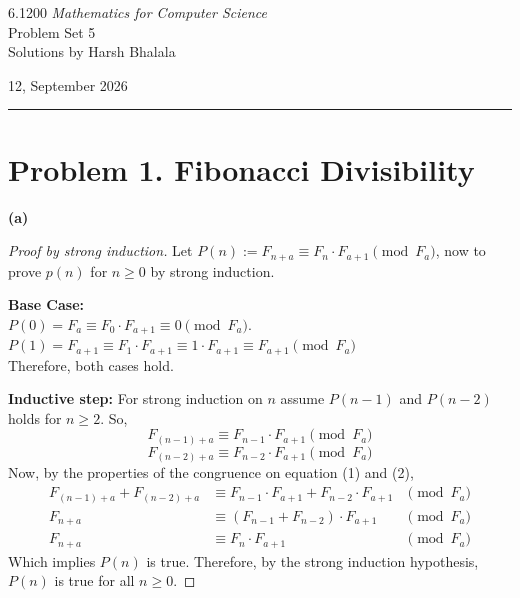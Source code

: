 \documentclass{article}
\begin{document}
\noindent
\begin{minipage}[t]{0.68\textwidth}
{\large 6.1200 \textit{Mathematics for Computer Science}}\\[4pt]
{\large Problem Set 5}\\[4pt]
{\large Solutions by Harsh Bhalala}
\end{minipage}%
\hfill
\begin{minipage}[t]{0.27\textwidth}
\raggedleft
{\large 12, September 2026}
\end{minipage}

\vspace{6pt}

\noindent\rule{\textwidth}{0.5pt}

\section*{Problem 1. Fibonacci Divisibility}

\textbf{(a)}

\begin{proof}[Proof by strong induction]
Let $P(n) := F_{n + a} \equiv F_{n} \cdot F_{a+1} \pmod{F_a}$, now to prove $p(n)$ for $n \geq 0$ by strong induction.

\textbf{Base Case:}\\
\indent\indent $P(0) = F_{a} \equiv F_0 \cdot F_{a+1} \equiv 0 \pmod{F_a} $.\\
\indent\indent $P(1) = F_{a+1} \equiv F_1 \cdot F_{a+1} \equiv 1 \cdot F_{a+1} \equiv F_{a+1} \pmod{F_a}$\\
Therefore, both cases hold.

\textbf{Inductive step:} For strong induction on $n$ assume $P(n-1)$ and $P(n-2)$ holds for $n \geq 2$. So,
\begin{equation}
F_{(n-1)+a} \equiv F_{n-1} \cdot F_{a+1} \pmod{F_a}
\end{equation}
\begin{equation}
F_{(n-2)+a} \equiv F_{n-2} \cdot F_{a+1} \pmod{F_a}
\end{equation}
Now, by the properties of the congruence on equation (1) and (2),
\[
\begin{aligned}
F_{(n-1)+a} + F_{(n-2)+a} &\equiv F_{n-1} \cdot F_{a+1} + F_{n-2} \cdot F_{a+1} &\pmod{F_a}\\
F_{n+a} &\equiv \left(F_{n-1} + F_{n-2} \right) \cdot F_{a+1} &\pmod{F_a}\\
F_{n+a} &\equiv F_n \cdot F_{a+1} &\pmod{F_a}
\end{aligned}
\]
Which implies $P(n)$ is true. Therefore, by the strong induction hypothesis, $P(n)$ is true for all $n \geq 0$.
\end{proof}
\end{document}
